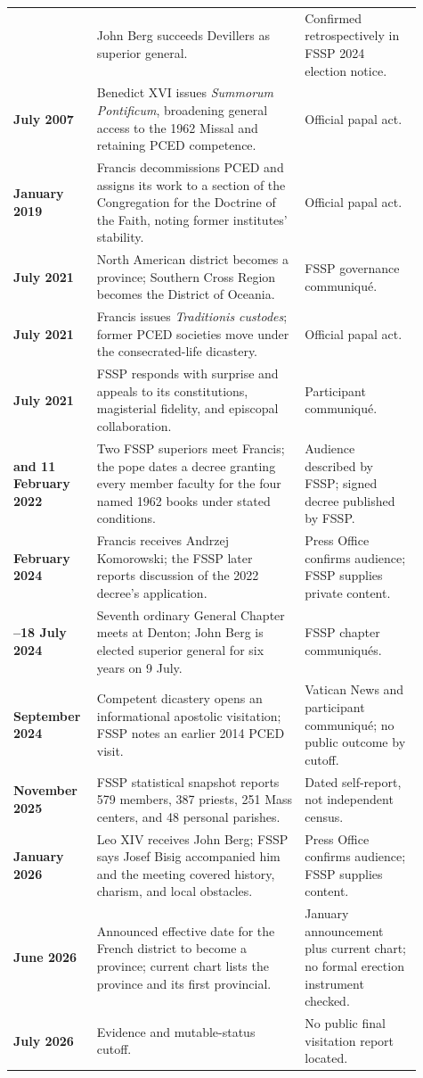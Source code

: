 \begin{longtable}{>{\bfseries\RaggedRight\arraybackslash}p{0.16\linewidth}>{\RaggedRight\arraybackslash}p{0.48\linewidth}>{\RaggedRight\arraybackslash}p{0.27\linewidth}}
2006 & John Berg succeeds Devillers as superior general. & Confirmed retrospectively in FSSP 2024 election notice.\\
7 July 2007 & Benedict XVI issues \emph{Summorum Pontificum}, broadening general access to the 1962 Missal and retaining PCED competence. & Official papal act.\\
17 January 2019 & Francis decommissions PCED and assigns its work to a section of the Congregation for the Doctrine of the Faith, noting former institutes' stability. & Official papal act.\\
1 July 2021 & North American district becomes a province; Southern Cross Region becomes the District of Oceania. & FSSP governance communiqué.\\
16 July 2021 & Francis issues \emph{Traditionis custodes}; former PCED societies move under the consecrated-life dicastery. & Official papal act.\\
20 July 2021 & FSSP responds with surprise and appeals to its constitutions, magisterial fidelity, and episcopal collaboration. & Participant communiqué.\\
4 and 11 February 2022 & Two FSSP superiors meet Francis; the pope dates a decree granting every member faculty for the four named 1962 books under stated conditions. & Audience described by FSSP; signed decree published by FSSP.\\
29 February 2024 & Francis receives Andrzej Komorowski; the FSSP later reports discussion of the 2022 decree's application. & Press Office confirms audience; FSSP supplies private content.\\
3--18 July 2024 & Seventh ordinary General Chapter meets at Denton; John Berg is elected superior general for six years on 9 July. & FSSP chapter communiqués.\\
September 2024 & Competent dicastery opens an informational apostolic visitation; FSSP notes an earlier 2014 PCED visit. & Vatican News and participant communiqué; no public outcome by cutoff.\\
1 November 2025 & FSSP statistical snapshot reports 579 members, 387 priests, 251 Mass centers, and 48 personal parishes. & Dated self-report, not independent census.\\
19 January 2026 & Leo XIV receives John Berg; FSSP says Josef Bisig accompanied him and the meeting covered history, charism, and local obstacles. & Press Office confirms audience; FSSP supplies content.\\
29 June 2026 & Announced effective date for the French district to become a province; current chart lists the province and its first provincial. & January announcement plus current chart; no formal erection instrument checked.\\
16 July 2026 & Evidence and mutable-status cutoff. & No public final visitation report located.\\
\end{longtable}

